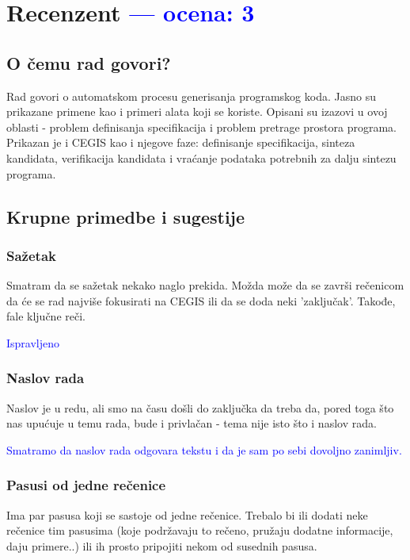 \documentclass[a4paper]{report}
\newcommand{\odgovor}[1]{\textcolor{blue}{#1}}
\begin{document}
\chapter{Recenzent \odgovor{--- ocena: 3} }


\section{O čemu rad govori?}
Rad govori o automatskom procesu generisanja programskog koda. Jasno su prikazane primene kao i primeri alata koji se koriste. Opisani su izazovi u ovoj oblasti - problem definisanja specifikacija i problem pretrage prostora programa. Prikazan je i CEGIS kao i njegove faze: definisanje specifikacija, sinteza kandidata, verifikacija kandidata i vraćanje podataka potrebnih za dalju sintezu programa.


\section{Krupne primedbe i sugestije}


\subsection{Sažetak}

Smatram da se sažetak nekako naglo prekida. Možda može da se završi rečenicom da će se rad najviše fokusirati na CEGIS ili da se doda neki 'zaključak'. Takođe, fale ključne reči.

\odgovor{Ispravljeno}



\subsection{Naslov rada}
Naslov je u redu, ali smo na času došli do zaključka da treba da, pored toga što nas upućuje u temu rada, bude i privlačan - tema nije isto što i naslov rada.

\odgovor{Smatramo da naslov rada odgovara tekstu i da je sam po sebi dovoljno zanimljiv.}

\subsection{Pasusi od jedne rečenice}
Ima par pasusa koji se sastoje od jedne rečenice. Trebalo bi ili dodati neke rečenice tim pasusima (koje podržavaju to rečeno, pružaju dodatne informacije, daju primere..) ili ih prosto pripojiti nekom od susednih pasusa.
\end{document}
